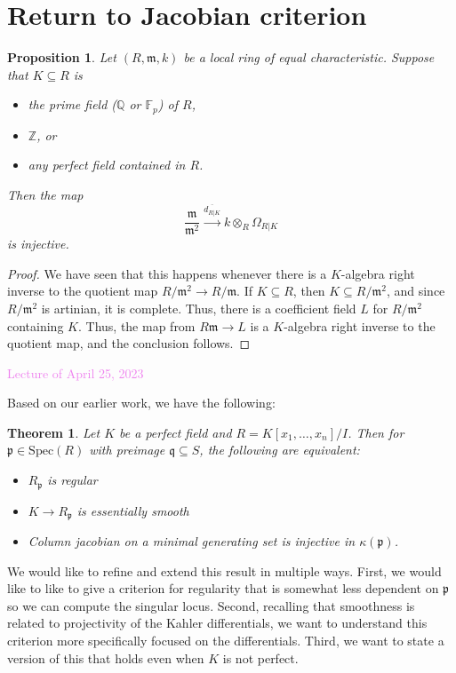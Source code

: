 \documentclass{amsart}[12pt]
\newcommand{\Spec}{\mathrm{Spec}}
\newcommand{\Apr}[1]{\textcolor{violet}{Lecture of April #1, 2023}}
\newcommand{\Q}{\mathbb{Q}}
\newcommand{\F}{\mathbb{F}}
\newcommand{\Z}{\mathbb{Z}}
\newcommand{\fp}{{\mathfrak p}}
\newcommand{\fm}{{\mathfrak m}}
\newcommand{\fq}{{\mathfrak q}}
\numberwithin{equation}{section}
\theoremstyle{plain} %
\newtheorem{thm}[equation]{Theorem}
\newtheorem{prop}[equation]{Proposition}
\theoremstyle{definition}
\theoremstyle{remark}
\newcommand{\xra}[1]{\xrightarrow{#1}}
\begin{document}
\section{Return to Jacobian criterion}



\begin{prop} Let $(R,\fm,k)$ be a local ring of equal characteristic. Suppose that $K \subseteq R$ is
\begin{itemize}
\item the prime field ($\Q$ or $\F_p$) of $R$,
\item $\Z$, or
\item any perfect field contained in $R$.
\end{itemize}
Then the map
\[ \frac{\fm}{\fm^2} \xra{\overline{d_{R|K}}} k \otimes_R \Omega_{R|K} \]
is injective.
\end{prop}
\begin{proof} We have seen that this happens whenever there is a $K$-algebra right inverse to the quotient map $R/\fm^2 \to R/\fm$. If $K\subseteq R$, then $K\subseteq R/\fm^2$, and since $R/\fm^2$ is artinian, it is complete. Thus, there is a coefficient field $L$ for $R/\fm^2$ containing $K$. Thus, the map from $R\fm \to L$ is a $K$-algebra right inverse to the quotient map, and the conclusion follows.
\end{proof}

\Apr{25}

Based on our earlier work, we have the following:

\begin{thm} Let $K$ be a perfect field and $R=K[x_1,\dots,x_n]/I$. Then for $\fp\in \Spec(R)$ with preimage $\fq\subseteq S$, the following are equivalent:
\begin{itemize}
\item $R_\fp$ is regular
\item $K\to R_\fp$ is essentially smooth
\item Column jacobian on a minimal generating set is injective in $\kappa(\fp)$.
\end{itemize}
\end{thm}

We would like to refine and extend this result in multiple ways. First, we would like to like to give a criterion for regularity that is somewhat less dependent on $\fp$ so we can compute the singular locus. Second, recalling that smoothness is related to projectivity of the Kahler differentials, we want to understand this criterion more specifically focused on the differentials. Third, we want to state a version of this that holds even when $K$ is not perfect. 
\end{document}
